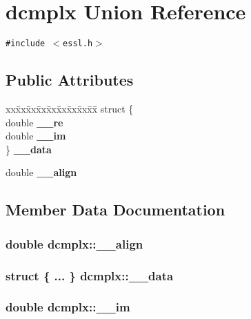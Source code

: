 \section{dcmplx Union Reference}
\label{uniondcmplx}
{\tt \#include $<$essl.h$>$}

\subsection*{Public Attributes}
\begin{CompactItemize}
\item 
\begin{tabbing}
xx\=xx\=xx\=xx\=xx\=xx\=xx\=xx\=xx\=\kill
struct \{\\
\>double {\bf \_\_re}\\
\>double {\bf \_\_im}\\
\} {\bf \_\_data}\\

\end{tabbing}\item 
double {\bf \_\-\_\-align}
\end{CompactItemize}


\subsection{Member Data Documentation}
\subsubsection{\setlength{\rightskip}{0pt plus 5cm}double {\bf dcmplx::\_\-\_\-align}}\label{uniondcmplx_9d990e2a21c6e905f96d29a8e16a9d41}


\subsubsection{\setlength{\rightskip}{0pt plus 5cm}struct \{ ... \}   {\bf dcmplx::\_\-\_\-data}}\label{uniondcmplx_4a303cc2de8c190f5185db101f339ae6}


\subsubsection{\setlength{\rightskip}{0pt plus 5cm}double {\bf dcmplx::\_\-\_\-im}}\label{uniondcmplx_ac00534367f554e76201a9c6f0f6c55d}


